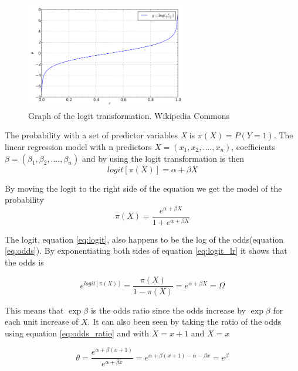 \documentclass[10pt,a4paper]{report}
\begin{document}
\begin{figure}[h]
    \centering
    \includegraphics[width=7cm]{logit.png}
    \caption{Graph of the logit transformation. Wikipedia Commons}
    \label{fig:logit}
\end{figure}

The probability with a set of predictor variables \emph{X} is $\pi(X)=P(Y=1)$. The linear regression model with n predictors $X=(x_1,x_2,....,x_n)$, coefficients $\beta=(\beta_1, \beta_2,....,\beta_n)$ and by using the logit transformation is then\cite{agresti_categorical}
\begin{equation}\label{eq:logit_lr}
logit[\pi(X)]=\alpha+\beta X
\end{equation}

By moving the logit to the right side of the equation we get the model of the probability\cite{agresti_categorical}
\begin{equation}
\pi(X)=\frac{e^{\alpha+\beta X}}{1+e^{\alpha+\beta X}}
\end{equation}

The logit, equation \ref{eq:logit}, also happens to be the log of the odds(equation \ref{eq:odds})\cite{agresti_categorical}. By exponentiating both sides of equation \ref{eq:logit_lr} it shows that the odds is \cite{agresti_categorical}

\begin{equation}
e^{logit[\pi(X)]}=\frac{\pi(X)}{1-\pi(X)}=e^{\alpha+\beta X}=\Omega
\end{equation}

This means that $\exp{\beta}$ is the odds ratio since the odds increase by $\exp{\beta}$ for each unit increase of $X$\cite{agresti_categorical}. It can also been seen by taking the ratio of the odds using equation \ref{eq:odds_ratio} and  with $X=x+1$ and $X=x$

\begin{equation}
\theta=\frac{e^{\alpha+\beta (x+1)}}{e^{\alpha+\beta x}}=e^{\alpha+\beta (x+1)-\alpha-\beta x}=e^{\beta}
\end{equation}
\end{document}
